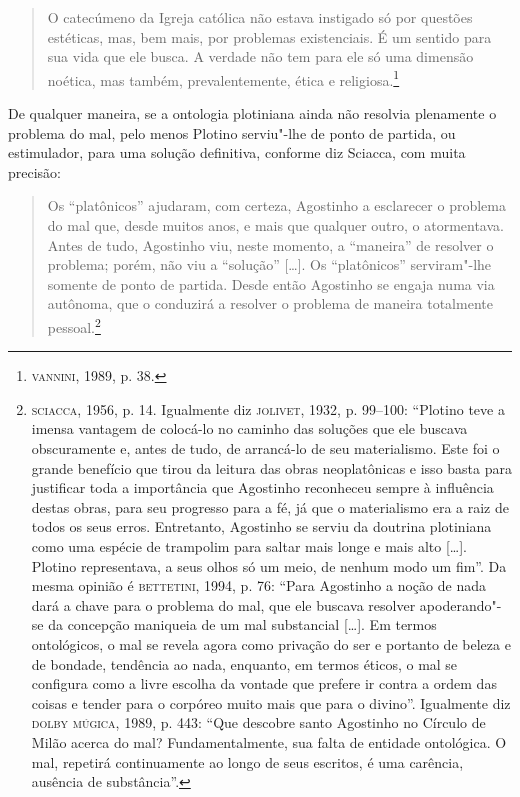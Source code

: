 \begin{quote}
O catecúmeno  da Igreja católica  não estava instigado  só por 
questões estéticas, mas, bem mais, por problemas existenciais. É
um sentido para sua vida que ele busca. A verdade não tem para
ele só uma dimensão  noética, mas também, prevalentemente, ética
e religiosa.\footnote{ \textsc{vannini}, 1989, p. 38.}  
\end{quote}

De qualquer maneira, se a ontologia plotiniana ainda não resolvia
plenamente  o problema do mal,  pelo  menos Plotino serviu"-lhe
de ponto de partida, ou estimulador, para uma solução
definitiva, conforme diz Sciacca, com muita precisão:

\begin{quote}
Os ``platônicos'' ajudaram, com certeza, Agostinho a esclarecer o
problema do mal que, desde muitos anos, e mais que qualquer
outro, o atormentava. Antes de tudo, Agostinho viu, neste
momento, a ``maneira'' de resolver o problema; porém, não viu a
``solução'' [\ldots{}]. Os ``platônicos'' serviram"-lhe somente de ponto
de partida. Desde então Agostinho se engaja numa via autônoma,
que o conduzirá a resolver o problema de maneira totalmente
pessoal.\footnote{ \textsc{sciacca}, 1956, p. 14. Igualmente diz
\textsc{jolivet},
1932, p. 99--100: “Plotino teve a imensa vantagem de colocá-lo no
caminho das soluções que ele buscava obscuramente e, antes de
tudo, de arrancá-lo de seu materialismo. Este foi o grande
benefício que tirou da leitura das obras neoplatônicas e isso
basta para justificar toda a importância que Agostinho
reconheceu sempre à influência destas obras, para seu progresso
para a fé, já que o materialismo era a raiz de todos os seus
erros. Entretanto,  Agostinho se serviu da doutrina plotiniana
como uma espécie de trampolim para saltar mais longe e mais alto
[\ldots{}]. Plotino representava, a seus olhos só um meio, de nenhum
modo um fim”. Da mesma opinião é \textsc{bettetini}, 1994, p. 76: “Para
Agostinho a noção de nada dará a chave para o problema do mal,
que ele buscava resolver apoderando"-se da concepção maniqueia de
um mal substancial [\ldots{}]. Em termos ontológicos, o mal se revela
agora como privação do ser e portanto de beleza e de bondade, 
tendência ao nada, enquanto, em termos éticos, o mal se
configura como a livre escolha da vontade que prefere ir contra
a ordem das coisas e tender para o corpóreo muito mais que para
o divino”. Igualmente diz \textsc{dolby} \textsc{múgica}, 1989, p. 443: “Que
descobre santo Agostinho no Círculo de Milão acerca do mal?
Fundamentalmente, sua falta de entidade ontológica. O mal,
repetirá continuamente ao longo de seus escritos, é uma
carência, ausência de substância”.}
\end{quote}

